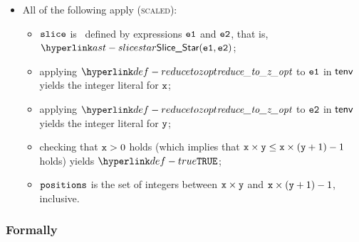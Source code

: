 \begin{itemize}
  \item All of the following apply (\textsc{scaled}):
  \begin{itemize}
    \item $\vslice$ is \scaledslice\ defined by expressions $\veone$ and $\vetwo$, that is, \\
          $\SliceStar(\veone, \vetwo)$;
    \item applying $\reducetozopt$ to $\veone$ in $\tenv$ yields the integer literal for $\vx$\ProseTerminateAs{\None};
    \item applying $\reducetozopt$ to $\vetwo$ in $\tenv$ yields the integer literal for $\vy$\ProseTerminateAs{\None};
    \item checking that $\vx > 0$ holds (which implies that $\vx \times \vy \leq \vx \times (\vy + 1) - 1$ holds) yields $\True$\ProseTerminateAs{\BitfieldSliceReversed};
    \item $\positions$ is the set of integers between $\vx \times \vy$ and $\vx \times (\vy + 1) - 1$, inclusive.
  \end{itemize}
\end{itemize}
\subsubsection{Formally}
\begin{mathpar}
\end{mathpar}

\begin{mathpar}
\end{mathpar}

